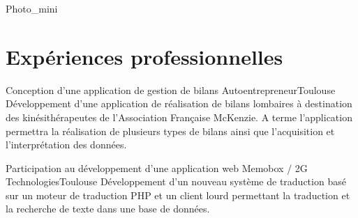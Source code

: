 \documentclass{my_cv_bis}
\begin{document}
 {
}{Photo_mini}

%


 
 \vspace{-2mm}
\section{Expériences professionnelles}
	{Conception d’une application de gestion de bilans}
	{Autoentrepreneur}{Toulouse}
	{
	Développement d'une application de réalisation de bilans lombaires à destination des kinésithérapeutes 
	de l'Association Française McKenzie. A terme l'application permettra la réalisation de plusieurs types de bilans ainsi que
	l'acquisition et l'interprétation des données.
	}
	{}

	{ Participation au développement d'une application web}
	{Memobox / 2G Technologies}{Toulouse}
	{Développement d'un nouveau système de traduction basé sur un moteur de traduction PHP et un client lourd
	permettant la traduction et la recherche de texte dans une base de données.  } {}
\end{document}
